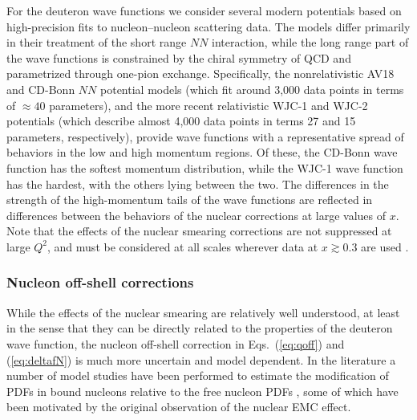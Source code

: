 \documentclass[aps,prd,amsmath,preprint]{revtex4}
\begin{document}
For the deuteron wave functions we consider several modern potentials
based on high-precision fits to nucleon--nucleon scattering data.
The models differ primarily in their treatment of the short range
$NN$ interaction, while the long range part of the wave functions is
constrained by the chiral symmetry of QCD and parametrized through
one-pion exchange.
Specifically, the nonrelativistic AV18 \cite{AV18} and CD-Bonn
\cite{CDBonn} $NN$ potential models (which fit around 3,000 data points
in terms of $\approx 40$ parameters), and the more recent relativistic
WJC-1 and WJC-2 \cite{WJC} potentials (which describe almost 4,000
data points in terms 27 and 15 parameters, respectively), provide
wave functions with a representative spread of behaviors in the
low and high momentum regions.  Of these, the CD-Bonn wave function
has the softest momentum distribution, while the WJC-1 wave function
has the hardest, with the others lying between the two.
The differences in the strength of the high-momentum tails of the
wave functions are reflected in differences between the behaviors
of the nuclear corrections at large values of $x$.
Note that the effects of the nuclear smearing corrections are not
suppressed at large $Q^2$, and must be considered at all scales
wherever data at $x \gtrsim 0.3$ are used \cite{CJ10, ACHL09, ARM12}.




\subsubsection{Nucleon off-shell corrections}
\label{sssec:offshell}

While the effects of the nuclear smearing are relatively well
understood, at least in the sense that they can be directly related to
the properties of the deuteron wave function, the nucleon off-shell
correction in Eqs.~(\ref{eq:qoff}) and (\ref{eq:deltafN}) is much
more uncertain and model dependent.  In the literature a number of
model studies have been performed to estimate the modification of
PDFs in bound nucleons relative to the free nucleon PDFs \cite{GL92,
MSToff, KPW94, MSTplb, KMPW95, MSS97, KP06, Mineo04, Cloet06},
some of which have been motivated by the original observation of
the nuclear EMC effect.
%
\end{document}
